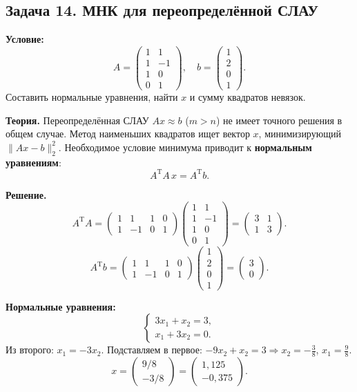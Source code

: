 \documentclass{article}
\begin{document}
\subsection*{Задача 14. МНК для переопределённой СЛАУ}
\textbf{Условие:}
$$
A = \begin{pmatrix} 1 & 1 \\ 1 & -1 \\ 1 & 0 \\ 0 & 1 \end{pmatrix}, \quad 
b = \begin{pmatrix} 1 \\ 2 \\ 0 \\ 1 \end{pmatrix}.
$$
Составить нормальные уравнения, найти $x$ и сумму квадратов невязок.

\textbf{Теория.} Переопределённая СЛАУ $Ax \approx b$ ($m > n$) не имеет точного решения в общем случае. Метод наименьших квадратов ищет вектор $x$, минимизирующий $\|Ax - b\|_2^2$. Необходимое условие минимума приводит к \textbf{нормальным уравнениям}:
$$A^\text{T}A\,x = A^\text{T}b.$$

\textbf{Решение.}
$$A^\text{T}A = \begin{pmatrix} 1 & 1 & 1 & 0 \\ 1 & -1 & 0 & 1 \end{pmatrix}\begin{pmatrix} 1 & 1 \\ 1 & -1 \\ 1 & 0 \\ 0 & 1 \end{pmatrix} = \begin{pmatrix} 3 & 1 \\ 1 & 3 \end{pmatrix}.$$
$$A^\text{T}b = \begin{pmatrix} 1 & 1 & 1 & 0 \\ 1 & -1 & 0 & 1 \end{pmatrix}\begin{pmatrix} 1 \\ 2 \\ 0 \\ 1 \end{pmatrix} = \begin{pmatrix} 3 \\ 0 \end{pmatrix}.$$

\textbf{Нормальные уравнения:}
$$\begin{cases} 3x_1 + x_2 = 3, \\ x_1 + 3x_2 = 0. \end{cases}$$
Из второго: $x_1 = -3x_2$. Подставляем в первое: $-9x_2 + x_2 = 3 \Rightarrow x_2 = -\tfrac{3}{8}$, $x_1 = \tfrac{9}{8}$.
$$\boxed{x = \begin{pmatrix} 9/8 \\ -3/8 \end{pmatrix} = \begin{pmatrix} 1,125 \\ -0,375 \end{pmatrix}.}$$
\end{document}
